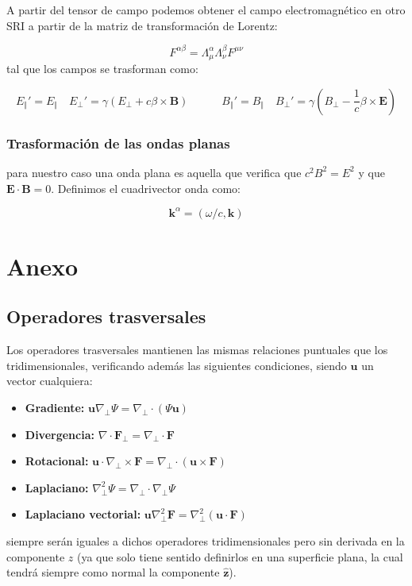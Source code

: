 \documentclass[12pt,a4paper]{article}
\newcommand{\parentesis}[1]{\left( #1  \right)}
\newcommand{\tquad}{\quad \quad \quad}
\newcommand{\dive}{\nabla \cdot}
\newcommand{\Bn}{\mathbf{B}}
\newcommand{\En}{\mathbf{E}}
\newcommand{\Fn}{\mathbf{F}}
\newcommand{\kn}{\mathbf{k}}
\newcommand{\un}{\mathbf{u}}
\newcommand{\hnz}{\hat{\mathbf{z}}}
\numberwithin{equation}{section}
\numberwithin{figure}{section}
\begin{document}
A partir del tensor de campo podemos obtener el campo electromagnético en otro SRI a partir de la matriz de transformación de Lorentz: 

\begin{equation}
F^{\alpha \beta}  = \Lambda_\mu^\alpha \Lambda_\nu^\beta F^{\mu \nu}
\end{equation}
tal que los campos se trasforman como:

\begin{equation}
E_\Vert'=E_\Vert \quad E_\perp' = \gamma (E_\perp + c \beta \times \Bn) \tquad 
B_\Vert'=B_\Vert \quad B_\perp' = \gamma \parentesis{B_\perp - \frac{1}{c} \beta \times \En}
\end{equation}

\subsubsection{Trasformación de las ondas planas}

para nuestro caso una onda plana es aquella que verifica que $c^2 B^2 = E^2$ y que $\En \cdot \Bn = 0$. Definimos el cuadrivector onda como:

\begin{equation}
\kn^\alpha = (\omega/c, \kn)
\end{equation}














\newpage

\section{Anexo}

\subsection{Operadores trasversales \label{Anx:operadores-transversales}}

Los operadores trasversales mantienen las mismas relaciones puntuales que los tridimensionales, verificando además las siguientes condiciones, siendo $\un$ un vector cualquiera:

\begin{itemize}
\item \textbf{Gradiente:} $ \un \nabla_\bot \Psi = \nabla_\bot \cdot (\Psi \un)$
\item \textbf{Divergencia:} $\dive \Fn_\bot = \nabla_\bot \cdot \Fn$
\item \textbf{Rotacional:} $ \un \cdot \nabla_\bot \times \Fn =  \nabla_\bot  \cdot (\un \times \Fn)$
\item \textbf{Laplaciano:} $ \nabla^2_\bot \Psi = \nabla_\bot \cdot \nabla_\bot \Psi$
\item \textbf{Laplaciano vectorial:} $ \un \nabla_\bot^2 \Fn = \nabla_\bot^2 (\un \cdot \Fn) $
\end{itemize}

siempre serán iguales a dichos operadores tridimensionales pero sin derivada en la componente $z$ (ya que solo tiene sentido definirlos en una superficie plana, la cual tendrá siempre como normal la componente $\hnz$). 
\end{document}
